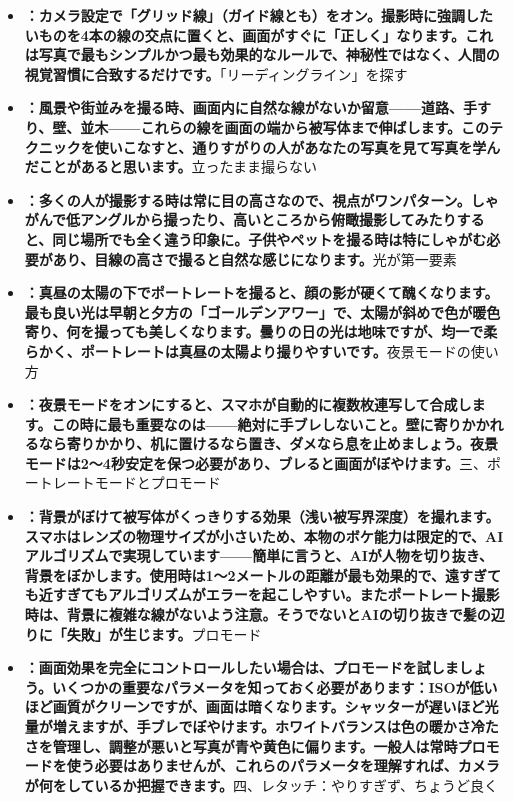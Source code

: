 \begin{itemize}
  \item \textbf{：カメラ設定で「グリッド線」（ガイド線とも）をオン。撮影時に強調したいものを4本の線の交点に置くと、画面がすぐに「正しく」なります。これは写真で最もシンプルかつ最も効果的なルールで、神秘性ではなく、人間の視覚習慣に合致するだけです。}「リーディングライン」を探す
  \item \textbf{：風景や街並みを撮る時、画面内に自然な線がないか留意——道路、手すり、壁、並木——これらの線を画面の端から被写体まで伸ばします。このテクニックを使いこなすと、通りすがりの人があなたの写真を見て写真を学んだことがあると思います。}立ったまま撮らない
  \item \textbf{：多くの人が撮影する時は常に目の高さなので、視点がワンパターン。しゃがんで低アングルから撮ったり、高いところから俯瞰撮影してみたりすると、同じ場所でも全く違う印象に。子供やペットを撮る時は特にしゃがむ必要があり、目線の高さで撮ると自然な感じになります。}光が第一要素
  \item \textbf{：真昼の太陽の下でポートレートを撮ると、顔の影が硬くて醜くなります。最も良い光は早朝と夕方の「ゴールデンアワー」で、太陽が斜めで色が暖色寄り、何を撮っても美しくなります。曇りの日の光は地味ですが、均一で柔らかく、ポートレートは真昼の太陽より撮りやすいです。}夜景モードの使い方
  \item \textbf{：夜景モードをオンにすると、スマホが自動的に複数枚連写して合成します。この時に最も重要なのは——絶対に手ブレしないこと。壁に寄りかかれるなら寄りかかり、机に置けるなら置き、ダメなら息を止めましょう。夜景モードは2〜4秒安定を保つ必要があり、ブレると画面がぼやけます。}三、ポートレートモードとプロモード
\end{itemize}


\begin{itemize}
  \item \textbf{：背景がぼけて被写体がくっきりする効果（浅い被写界深度）を撮れます。スマホはレンズの物理サイズが小さいため、本物のボケ能力は限定的で、AIアルゴリズムで実現しています——簡単に言うと、AIが人物を切り抜き、背景をぼかします。使用時は1〜2メートルの距離が最も効果的で、遠すぎても近すぎてもアルゴリズムがエラーを起こしやすい。またポートレート撮影時は、背景に複雑な線がないよう注意。そうでないとAIの切り抜きで髪の辺りに「失敗」が生じます。}プロモード
  \item \textbf{：画面効果を完全にコントロールしたい場合は、プロモードを試しましょう。いくつかの重要なパラメータを知っておく必要があります：ISOが低いほど画質がクリーンですが、画面は暗くなります。シャッターが遅いほど光量が増えますが、手ブレでぼやけます。ホワイトバランスは色の暖かさ冷たさを管理し、調整が悪いと写真が青や黄色に偏ります。一般人は常時プロモードを使う必要はありませんが、これらのパラメータを理解すれば、カメラが何をしているか把握できます。}四、レタッチ：やりすぎず、ちょうど良く
\end{itemize}

